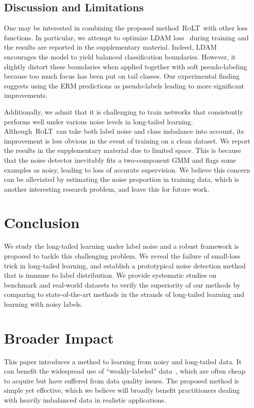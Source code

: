 \documentclass{article}
\def\algo{{\textsc{RoLT}}}
\begin{document}
\subsection{Discussion and Limitations}\label{sec:discussion}
One may be interested in combining the proposed method~\algo~with other loss functions. In particular, we attempt to optimize LDAM loss~\cite{DBLP:conf/nips/CaoWGAM19ldam} during training and the results are reported in the supplementary material. Indeed, LDAM encourages the model to yield balanced classification boundaries. However, it slightly distort these boundaries when applied together with soft pseudo-labeling because too much focus has been put on tail classes. Our experimental finding suggests using the ERM predictions as pseudo-labels leading to more significant improvements.

Additionally, we admit that it is challenging to train networks that consistently performs well under various noise levels in long-tailed learning. Although~\algo~can take both label noise and class imbalance into account, its improvement is less obvious in the event of training on a clean dataset. We report the results in the supplementary material due to limited space. This is because that the noise detector inevitably fits a two-component GMM and flags some examples as noisy, leading to loss of accurate supervision. We believe this concern can be alleviated by estimating the noise proportion in training data, which is another interesting research problem, and leave this for future work.


\section{Conclusion}
We study the long-tailed learning under label noise and a robust framework is proposed to tackle this challenging problem. We reveal the failure of small-loss trick in long-tailed learning, and establish a prototypical noise detection method that is immune to label distribution. We provide systematic studies on benchmark and real-world datasets to verify the superiority of our methods by comparing to state-of-the-art methods in the strands of long-tailed learning and learning with noisy labels. 

\section*{Broader Impact}
This paper introduces a method to learning from noisy and long-tailed data. It can benefit the widespread use of ``weakly-labeled'' data~\cite{webvision,li2020dividemix,li2021mopro}, which are often cheap to acquire but have suffered from data quality issues. The proposed method is simple yet effective, which we believe will broadly benefit practitioners dealing with heavily imbalanced data in realistic applications.
\end{document}
